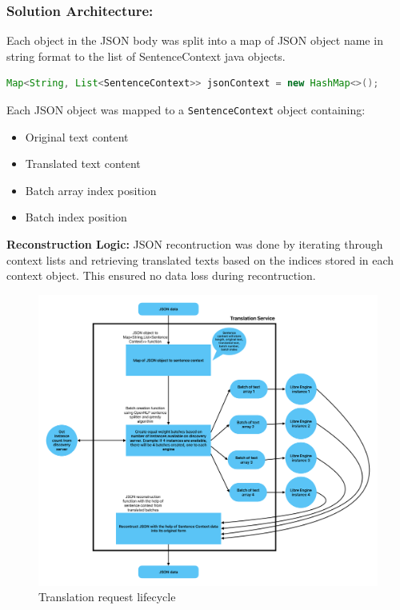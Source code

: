 \subsubsection{Solution Architecture:}

Each object in the JSON body was split into a map of JSON object name in string format to the list of SentenceContext java objects.

\begin{lstlisting}[language=Java]
Map<String, List<SentenceContext>> jsonContext = new HashMap<>();
\end{lstlisting}

Each JSON object was mapped to a \texttt{SentenceContext} object containing:
\begin{itemize}
    \item Original text content
    \item Translated text content
    \item Batch array index position
    \item Batch index position
\end{itemize}

\textbf{Reconstruction Logic:} JSON recontruction was done by iterating through context lists and retrieving translated texts based on the indices stored in each context object. This ensured no data loss during recontruction.

\begin{figure}[H]
    \centering
    \includegraphics[width=1\linewidth]{chapter/05_implementation/backend/B_architectural_design/Translation_Service.pdf}
    \caption{Translation request lifecycle}
    \label{fig:translation_engine_radar}
\end{figure}